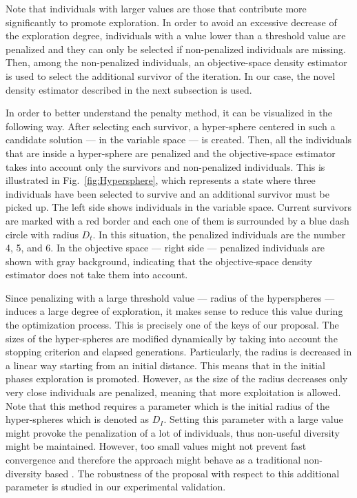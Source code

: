 Note that individuals with larger \DCS{} values are those that contribute more significantly to promote exploration.
%
In order to avoid an excessive decrease of the exploration degree, individuals with a \DCS{} value lower 
than a threshold value are penalized and they can only be selected if non-penalized individuals are missing.%
%
Then, among the non-penalized individuals, an objective-space density estimator is used to select the additional
survivor of the iteration.
%
In our case, the novel density estimator described in the next subsection is used. 

In order to better understand the penalty method, it can be visualized in the following way.
%
After selecting each survivor, a hyper-sphere 
centered in such a candidate solution --- in the variable space --- is created.
%
Then, all the individuals that are inside a hyper-sphere are penalized and the objective-space estimator takes 
into account only the survivors and non-penalized individuals.
%
This is illustrated in Fig.~\ref{fig:Hypersphere}, which represents a state where three individuals have been 
selected to survive and an additional survivor must be picked up.
%
The left side shows individuals in the variable space.
%
Current survivors are marked with a red border and each one of them is surrounded by a blue dash circle with 
radius $D_t$.
%
In this situation, the penalized individuals are the number 4, 5, and 6.
%
In the objective space --- right side --- penalized individuals are shown with gray background, indicating
that the objective-space density estimator does not take them into account.

Since penalizing with a large threshold value --- radius of the hyperspheres --- induces a large degree of 
exploration, it makes sense to reduce this value during the optimization process.
%
This is precisely one of the keys of our proposal.
%
The sizes of the hyper-spheres are modified dynamically by taking into account the stopping 
criterion and elapsed generations.
%
Particularly, the radius is decreased in a linear way starting from an initial distance.
%
This means that in the initial phases exploration is promoted.
%
However, as the size of the radius decreases only very close individuals are penalized, meaning that more 
exploitation is allowed.
%
Note that this method requires a parameter which is the initial radius of the hyper-spheres which is denoted as $D_I$. 
%
Setting this parameter with a large value might provoke the penalization of a lot of individuals,
thus non-useful diversity might be maintained.
%
However, too small values might not prevent fast convergence and therefore the approach  
might behave as a traditional non-diversity based \MOEA{}.
%
The robustness of the proposal with respect to this additional parameter is studied in our experimental validation.

